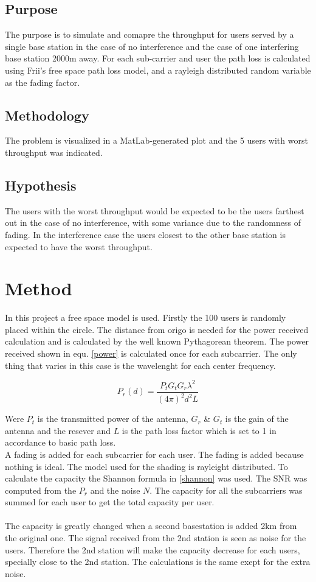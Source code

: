 \documentclass[twocolumn]{article}
\begin{document}
\subsection{Purpose}
The purpose is to simulate and comapre the throughput for users served by a single base station in the case of no interference and the case of one interfering base station 2000m away. For each sub-carrier and user the path loss is calculated using Frii's free space path loss model, and a rayleigh distributed random variable as the fading factor.


\subsection{Methodology}
The problem is visualized in a MatLab-generated plot and the 5 users with worst throughput was indicated.

\subsection{Hypothesis}
The users with the worst throughput would be expected to be the users farthest out in the case of no interference, with some variance due to the randomness of fading. In the interference case the users closest to the other base station is expected to have the worst throughput.

\section{Method}
In this project a free space model is used.
Firstly the 100 users is randomly placed within the circle. The distance from origo is needed for the power received calculation and is calculated by the well known Pythagorean theorem. The power received shown in equ. \eqref{power}  is calculated once for each subcarrier. The only thing that varies in this case is the wavelenght for each center frequency.

\begin{equation}
\label{power}
P_r(d)=\frac{P_tG_tG_r\lambda^2}{(4\pi)^2d^2L}
\end{equation}

Were $P_t$ is the transmitted power of the antenna, $G_r$ \& $G_t$ is the gain of the antenna and the resever and $L$ is the path loss factor which is set to 1 in accordance to basic path loss.\\

A fading is added for each subcarrier for each user. The fading is added because nothing is ideal. The model used for the shading is rayleight distributed.
To calculate the capacity the Shannon formula in \eqref{shannon} was used. The SNR was computed from the $P_r$ and the noise $N$.
The capacity for all the subcarriers was summed for each user to get the total capacity per user.
\\
\\
The capacity is greatly changed when a second basestation is added 2km from the original one.
The signal received from the 2nd station is seen as noise for the users.
Therefore the 2nd station will make the capacity decrease for each users, specially close to the 2nd station.
The calculations is the same exept for the extra noise.
\end{document}
